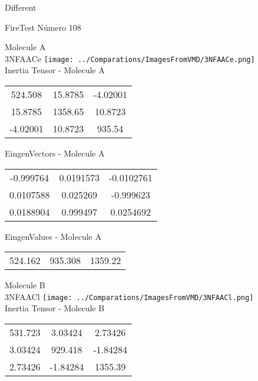 \begin{center}
\vtab
\vtab
\textcolor{NavyBlue}{\Large Different}
\end{center}

 \newpage

\vtab[-2cm]
\begin{center}
{\large FireTest \tab Número 108}
\end{center}
\begin{multicols}{2}
\begin{center}

Molecule A \\ 
3NFAACe
\texttt{[image: ../Comparations/ImagesFromVMD/3NFAACe.png]}
\\
Inertia Tensor - Molecule A \\
\vtab

\begin{tabular}{|c c c|}
524.508	 & 	15.8785	 & 	-4.02001	 \\
15.8785	 & 	1358.65	 & 	10.8723	 \\
-4.02001	 & 	10.8723	 & 	935.54
\end{tabular}

\vtab
 EingenVectors - Molecule A     \\
\vtab
\begin{tabular}{|c c c|}
-0.999764	 & 	0.0191573	 & 	-0.0102761	 \\
0.0107588	 & 	0.025269	 & 	-0.999623	 \\
0.0188904	 & 	0.999497	 & 	0.0254692
\end{tabular}

\vtab
 EingenValues - Molecule A     \\
\vtab
\begin{tabular}{|c c c|}
524.162	 & 	935.308	 & 	1359.22	 \\
\end{tabular}
\columnbreak

Molecule B \\ 
3NFAACl
\texttt{[image: ../Comparations/ImagesFromVMD/3NFAACl.png]}
\\
Inertia Tensor - Molecule B \\
\vtab

\begin{tabular}{|c c c|}
531.723	 & 	3.03424	 & 	2.73426	 \\
3.03424	 & 	929.418	 & 	-1.84284	 \\
2.73426	 & 	-1.84284	 & 	1355.39
\end{tabular}


\end{center}
\end{multicols}
